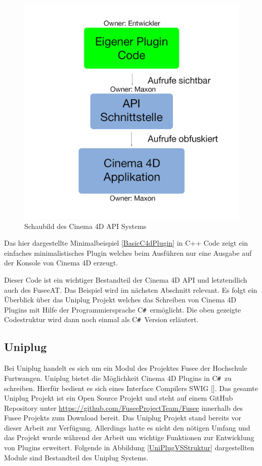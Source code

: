 \documentclass[pagesize, paper=a4, fontsize=12pt, titlepage=true, headings=small, headnosepline, abstractoff, liststotoc, nochapterprefix, plainheadsepline, twoside]{scrreprt}
\newcommand{\CSS}{C\texttt{\# }}
\begin{document}
\begin{figure}[ht]
	\centering
  \includegraphics[width=\linewidth]{Bilder/C4D_Api_Schaubild_v1.jpg}
	\caption{Schaubild des Cinema 4D API Systems}
	\label{C4D API Schaubild}
\end{figure}

Das hier dargestellte Minimalbeispiel \ref{BasicC4dPlugin} in C++ Code zeigt ein einfaches minimalistisches Plugin welches beim Ausführen nur eine Ausgabe auf der Konsole von Cinema 4D erzeugt.

\newpage

Dieser Code ist ein wichtiger Bestandteil der Cinema 4D API und letztendlich auch des FuseeAT. Das Beispiel wird im nächsten Abschnitt relevant. Es folgt ein Überblick über das Uniplug Projekt welches das Schreiben von Cinema 4D Plugins mit Hilfe der Programmiersprache \CSS ermöglicht. Die oben gezeigte Codestruktur wird dann noch einmal als \CSS Version erläutert.

\subsection{Uniplug}
Bei Uniplug handelt es sich um ein Modul des Projektes Fusee der Hochschule Furtwangen. Uniplug bietet die Möglichkeit Cinema 4D Plugins in \CSS zu schreiben. Hierfür bedient es sich eines Interface Compilers SWIG []. Das gesamte Uniplug Projekt ist ein Open Source Projekt und steht auf einem GitHub Repository unter \url{https://github.com/FuseeProjectTeam/Fusee} innerhalb des Fusee Projekts zum Download bereit. Das Uniplug Projekt stand bereits vor dieser Arbeit zur Verfügung. Allerdings hatte es nicht den nötigen Umfang und das Projekt wurde während der Arbeit um wichtige Funktionen zur Entwicklung von Plugins erweitert. Folgende in Abbildung \ref{UniPlugVSStruktur} dargestellten Module sind Bestandteil des Uniplug Systems.
\end{document}

